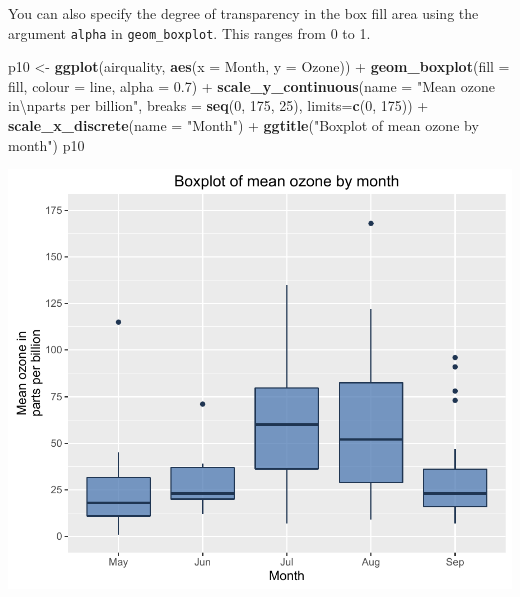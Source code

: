 \documentclass[]{article}
\newenvironment{Shaded}{\begin{snugshade}}{\end{snugshade}}
\newcommand{\KeywordTok}[1]{\textcolor[rgb]{0.13,0.29,0.53}{\textbf{{#1}}}}
\newcommand{\DataTypeTok}[1]{\textcolor[rgb]{0.13,0.29,0.53}{{#1}}}
\newcommand{\DecValTok}[1]{\textcolor[rgb]{0.00,0.00,0.81}{{#1}}}
\newcommand{\FloatTok}[1]{\textcolor[rgb]{0.00,0.00,0.81}{{#1}}}
\newcommand{\CharTok}[1]{\textcolor[rgb]{0.31,0.60,0.02}{{#1}}}
\newcommand{\StringTok}[1]{\textcolor[rgb]{0.31,0.60,0.02}{{#1}}}
\newcommand{\NormalTok}[1]{{#1}}
\begin{document}
You can also specify the degree of transparency in the box fill area
using the argument \texttt{alpha} in \texttt{geom\_boxplot}. This ranges
from 0 to 1.

\begin{Shaded}
\begin{Highlighting}[]
\NormalTok{p10 <-}\StringTok{ }\KeywordTok{ggplot}\NormalTok{(airquality, }\KeywordTok{aes}\NormalTok{(}\DataTypeTok{x =} \NormalTok{Month, }\DataTypeTok{y =} \NormalTok{Ozone)) +}\StringTok{ }
\StringTok{  }\KeywordTok{geom_boxplot}\NormalTok{(}\DataTypeTok{fill =} \NormalTok{fill, }\DataTypeTok{colour =} \NormalTok{line,}
    \DataTypeTok{alpha =} \FloatTok{0.7}\NormalTok{) +}
\StringTok{  }\KeywordTok{scale_y_continuous}\NormalTok{(}\DataTypeTok{name =} \StringTok{"Mean ozone in}\CharTok{\textbackslash{}n}\StringTok{parts per billion"}\NormalTok{,}
    \DataTypeTok{breaks =} \KeywordTok{seq}\NormalTok{(}\DecValTok{0}\NormalTok{, }\DecValTok{175}\NormalTok{, }\DecValTok{25}\NormalTok{), }\DataTypeTok{limits=}\KeywordTok{c}\NormalTok{(}\DecValTok{0}\NormalTok{, }\DecValTok{175}\NormalTok{)) +}
\StringTok{  }\KeywordTok{scale_x_discrete}\NormalTok{(}\DataTypeTok{name =} \StringTok{"Month"}\NormalTok{) +}
\StringTok{  }\KeywordTok{ggtitle}\NormalTok{(}\StringTok{"Boxplot of mean ozone by month"}\NormalTok{)}
\NormalTok{p10}
\end{Highlighting}
\end{Shaded}

\begin{center}\includegraphics{10_Boxplots_pdf/box_8-1} \end{center}
\end{document}
